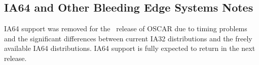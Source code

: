 \subsection{IA64 and Other Bleeding Edge Systems Notes}
\label{subsec:ia64notes}

IA64 support was removed for the \oscarversion\ release of OSCAR due to
timing problems and the significant differences between current IA32
distributions and the freely available IA64 distributions.  IA64 support is
fully expected to return in the next release.

%
% 
%   
% 
% 
% 
% 

